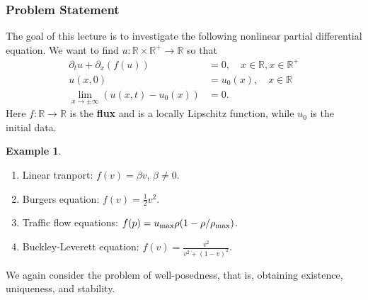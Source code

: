 \documentclass{article}
\theoremstyle{definition}
\newtheorem{example}[theorem]{Example}
\theoremstyle{definition}
\newcommand{\R}{\mathbb{R}}
\begin{document}
\subsubsection{Problem Statement}
The goal of this lecture is to investigate the following nonlinear partial differential equation. We want to find $u:\R\times \R^+\to \R$ so that
\begin{align*}
    \partial_t u+\partial_{x}(f(u))&=0,\quad x\in \R,x\in \R^+ \\
    u(x,0)&=u_0(x),\quad x\in \R \\
    \lim_{x\to \pm \infty}(u(x,t)-u_0(x))&=0.
\end{align*}
Here $f:\R\to \R$ is the \textbf{flux} and is a locally Lipschitz function, while $u_0$ is the initial data.
\begin{example}
    \begin{enumerate}
        \item Linear tranport: $f(v)=\beta v$, $\beta\neq 0$.
        \item Burgers equation: $f(v)=\frac{1}{2}v^2$.
        \item Traffic flow equations: $f(p)=u_{\rm max}\rho(1-\rho/\rho_{\rm max})$.
        \item Buckley-Leverett equation: $f(v)=\frac{v^2}{v^2+(1-v)^2}.$
    \end{enumerate}
\end{example}
We again consider the problem of well-posedness, that is, obtaining existence, uniqueness, and stability.
\end{document}
